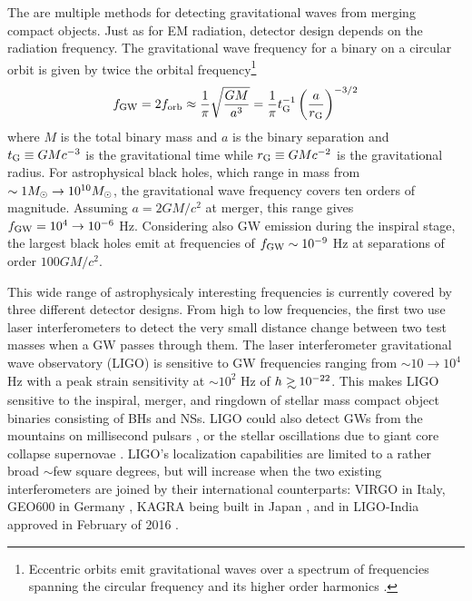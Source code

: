 The are multiple methods for detecting gravitational waves from merging
compact objects. Just as for EM radiation, detector design depends on the
radiation frequency. The gravitational wave frequency for a binary on a
circular orbit is given by twice the orbital frequency\footnote{Eccentric
orbits emit gravitational waves over a spectrum of frequencies spanning the
circular frequency and its higher order harmonics \citep{}.} \begin{equation}
f_{\rm{GW}} = 2 f_{\rm{orb}} \approx  \frac{1}{\pi} \sqrt{\frac{G M }{a^3}} =
\frac{1}{\pi} t^{-1}_{\rm{G}} \left( \frac{a}{r_{\rm{G}}} \right)^{-3/2}
\end{equation} where $M$ is the total binary mass and $a$ is the binary
separation and $t_{\rm{G}} \equiv GMc^{-3}$ is the gravitational time while
$r_{\rm{G}} \equiv GMc^{-2}$ is the gravitational radius.  For astrophysical
black holes, which range in mass from $\sim 1 {M_{\odot}} \rightarrow 10^{10}
{M_{\odot}}$, the gravitational wave frequency covers ten orders of magnitude.
Assuming $a = 2GM/c^2$ at merger, this range gives $f_{\rm{GW}} = 10^4 \rightarrow
10^{-6}$ Hz. Considering also GW emission during the inspiral stage, the
largest black holes emit at frequencies of $f_{\rm{GW}} \sim 10^{-9}$ Hz at
separations of order $100 GM/c^2$.


This wide range of astrophysicaly interesting frequencies is currently covered
by three different detector designs. From high to low frequencies, the first
two use laser interferometers to detect the very small distance change between
two test masses when a GW passes through them. The laser interferometer
gravitational wave observatory (LIGO) is sensitive to GW frequencies ranging
from $\sim 10 \rightarrow 10^4$ Hz with a peak strain sensitivity at
$\sim10^{2}$ Hz of $h \gsim 10^{-22}$. This makes LIGO sensitive to the
inspiral, merger, and ringdown of stellar mass compact object binaries
consisting of BHs and NSs. LIGO could also detect GWs from the mountains on
millisecond pulsars \citep{}, or the stellar oscillations due to giant core
collapse supernovae \citep{}. LIGO's localization capabilities are limited to
a rather broad $\sim$few square degrees, but will increase when the two
existing interferometers are joined by their international counterparts: VIRGO
\citep{} in Italy, GEO600 in Germany \citep{}, KAGRA being built in Japan
\citep{}, and in LIGO-India approved in February of 2016 \citep{}.

